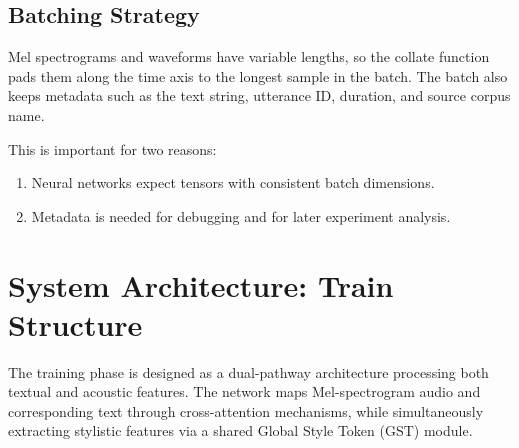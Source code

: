 \documentclass[11pt]{article}
\begin{document}
\subsection{Batching Strategy}

Mel spectrograms and waveforms have variable lengths, so the collate function pads them along the time axis to the longest sample in the batch. The batch also keeps metadata such as the text string, utterance ID, duration, and source corpus name.

This is important for two reasons:

\begin{enumerate}[leftmargin=1.5em]
  \item Neural networks expect tensors with consistent batch dimensions.
  \item Metadata is needed for debugging and for later experiment analysis.
\end{enumerate}

\section{System Architecture: Train Structure}

The training phase is designed as a dual-pathway architecture processing both textual and acoustic features. The network maps Mel-spectrogram audio and corresponding text through cross-attention mechanisms, while simultaneously extracting stylistic features via a shared Global Style Token (GST) module.
\end{document}

